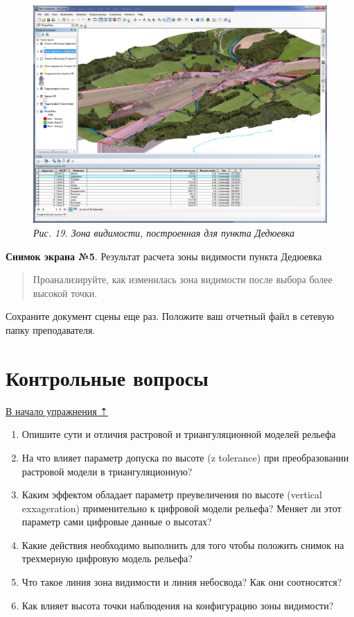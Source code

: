 \documentclass[]{book}
\theoremstyle{definition}
\theoremstyle{definition}
\theoremstyle{definition}
\theoremstyle{remark}
\begin{document}
\begin{enumerate}
  \begin{figure}
  \centering
  \includegraphics{images/Ex18/image21.png}
  \caption{\emph{Рис. 19. Зона видимости, построенная для пункта
  Дедюевка}}
  \end{figure}

  \textbf{Снимок экрана №5}. Результат расчета зоны видимости пункта
  Дедюевка

  \begin{quote}
  Проанализируйте, как изменилась зона видимости после выбора более
  высокой точки.
  \end{quote}
\end{enumerate}

Сохраните документ сцены еще раз. Положите ваш отчетный файл в сетевую
папку преподавателя.

\hypertarget{threed-modelling-questions}{%
\section{Контрольные вопросы}\label{threed-modelling-questions}}

\protect\hyperlink{threed-modelling}{В начало упражнения ⇡}

\begin{enumerate}
\def\labelenumi{\arabic{enumi}.}
\item
  Опишите сути и отличия растровой и триангуляционной моделей рельефа
\item
  На что влияет параметр допуска по высоте (z tolerance) при
  преобразовании растровой модели в триангуляционную?
\item
  Каким эффектом обладает параметр преувеличения по высоте (vertical
  exxageration) применительно к цифровой модели рельефа? Меняет ли этот
  параметр сами цифровые данные о высотах?
\item
  Какие действия необходимо выполнить для того чтобы положить снимок на
  трехмерную цифровую модель рельефа?
\item
  Что такое линия зона видимости и линия небосвода? Как они соотносятся?
\item
  Как влияет высота точки наблюдения на конфигурацию зоны видимости?
\end{enumerate}
\end{document}
